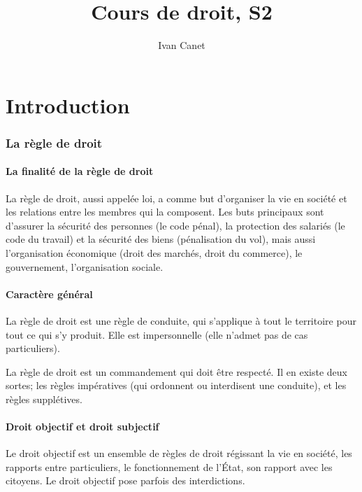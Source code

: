 \documentclass[10pt,a4paper]{article}
\begin{document}
\title{Cours de droit, S2}
\author{Ivan Canet}
\maketitle
\tableofcontents

\part{Introduction}

\section{La règle de droit}

\subsection{La finalité de la règle de droit}

La règle de droit, aussi appelée loi, a comme but d'organiser la vie en société et les relations entre les membres qui la composent. Les buts principaux sont d'assurer la sécurité des personnes (le code pénal), la protection des salariés (le code du travail) et la sécurité des biens (pénalisation du vol), mais aussi l'organisation économique (droit des marchés, droit du commerce), le gouvernement, l'organisation sociale.

\subsection{Caractère général}

La règle de droit est une règle de conduite, qui s'applique à tout le territoire pour tout ce qui s'y produit. Elle est impersonnelle (elle n'admet pas de cas particuliers).

La règle de droit est un commandement qui doit être respecté. Il en existe deux sortes; les règles impératives (qui ordonnent ou interdisent une conduite), et les règles supplétives.

\subsection{Droit objectif et droit subjectif}

Le droit objectif est un ensemble de règles de droit régissant la vie en société, les rapports entre particuliers, le fonctionnement de l'État, son rapport avec les citoyens. Le droit objectif pose parfois des interdictions.
\end{document}
